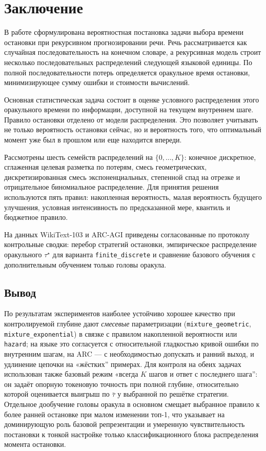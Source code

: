 \section{Заключение}

В работе сформулирована вероятностная постановка задачи выбора времени остановки при рекурсивном
прогнозировании речи. Речь рассматривается как случайная последовательность на конечном словаре, а
рекурсивная модель строит несколько последовательных распределений следующей языковой единицы. По
полной последовательности потерь определяется оракульное время остановки, минимизирующее сумму
ошибки и стоимости вычислений.

Основная статистическая задача состоит в оценке условного распределения этого оракульного времени
по информации, доступной на текущем внутреннем шаге. Правило остановки отделено от модели
распределения. Это позволяет учитывать не только вероятность остановки сейчас, но и вероятность
того, что оптимальный момент уже был в прошлом или еще находится впереди.

Рассмотрены шесть семейств распределений на \(\{0,\ldots,K\}\): конечное дискретное, сглаженная
целевая разметка по потерям, смесь геометрических, дискретизированная смесь экспоненциальных,
степенной спад на отрезке и отрицательное биномиальное распределение. Для принятия решения
используются пять правил: накопленная вероятность, малая вероятность будущего улучшения, условная
интенсивность по предсказанной мере, квантиль и бюджетное правило.

На данных WikiText-103 и ARC-AGI приведены согласованные по протоколу контрольные сводки: перебор
стратегий остановки, эмпирическое распределение оракульного \(\tau^\star\) для варианта
\texttt{finite\_discrete} и сравнение базового обучения с дополнительным обучением только головы
оракула.

\subsection{Вывод}

По результатам экспериментов наиболее устойчиво хорошее качество при контролируемой глубине дают
\emph{смесевые} параметризации (\texttt{mixture\_geometric}, \texttt{mixture\_exponential}) в связке
с правилом накопленной вероятности или \texttt{hazard}; на языке это согласуется с относительной
гладкостью кривой ошибки по внутренним шагам, на ARC --- с необходимостью допускать и ранний выход,
и удлинение цепочки на «жёстких'' примерах. Для контроля на обеих задачах использован также базовый
режим «всегда \(K\) шагов и ответ с последнего шага'': он задаёт опорную токеновую точность при
полной глубине, относительно которой оценивается выигрыш по \(\bar\tau\) у выбранной по решётке
стратегии. Отдельное дообучение головы оракула в основном смещает
выбранное правило к более ранней остановке при малом изменении топ-1, что указывает на
доминирующую роль базовой репрезентации и умеренную чувствительность постановки к тонкой настройке
только классификационного блока распределения момента остановки.

